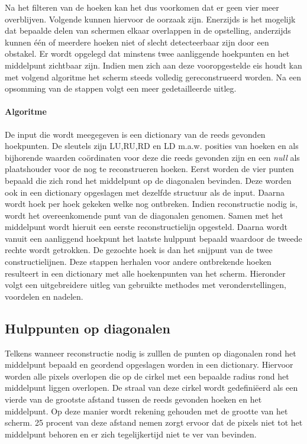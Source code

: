 
	Na het filteren van de hoeken kan het dus voorkomen dat er geen vier meer overblijven. Volgende kunnen hiervoor de oorzaak zijn. Enerzijds is het mogelijk dat bepaalde delen van schermen elkaar overlappen in de opstelling, anderzijds kunnen één of meerdere hoeken niet of slecht detecteerbaar zijn door een obstakel. Er wordt opgelegd dat minstens twee aanliggende hoekpunten en het middelpunt zichtbaar zijn. Indien men zich aan deze vooropgestelde eis houdt kan met volgend algoritme het scherm steeds volledig gereconstrueerd worden. Na een opsomming van de stappen volgt een meer gedetailleerde uitleg.
	\paragraph{Algoritme}
	 De input die wordt meegegeven is een dictionary van de reeds gevonden hoekpunten. De sleutels zijn LU,RU,RD en LD m.a.w. posities van hoeken en als bijhorende waarden coördinaten voor deze die reeds gevonden zijn en een \textit{null} als plaatshouder voor de nog te reconstrueren hoeken. \newline
	 Eerst worden de vier punten bepaald die zich rond het middelpunt op de diagonalen bevinden. Deze worden ook in een dictionary opgeslagen met dezelfde structuur als de input. Daarna wordt hoek per hoek gekeken welke nog ontbreken. Indien reconstructie nodig is, wordt het overeenkomende punt van de diagonalen genomen. Samen met het middelpunt wordt hieruit een eerste reconstructielijn opgesteld. Daarna wordt vanuit een aanliggend hoekpunt het laatste hulppunt bepaald waardoor de tweede rechte wordt getrokken. De gezochte hoek is dan het snijpunt van de twee constructielijnen. Deze stappen herhalen voor andere ontbrekende hoeken resulteert in een dictionary met alle hoekenpunten van het scherm. Hieronder volgt een uitgebreidere uitleg van gebruikte methodes met veronderstellingen, voordelen en nadelen.
	
	\subsection{Hulppunten op diagonalen} \label{subsec:diagonalen}
		
		Telkens wanneer reconstructie nodig is zulllen de punten op diagonalen rond het middelpunt bepaald en geordend opgeslagen worden in een dictionary. Hiervoor worden alle pixels overlopen die op de cirkel met een bepaalde radius rond het middelpunt liggen overlopen. De straal van deze cirkel wordt gedefiniëerd als een vierde van de grootste afstand tussen de reeds gevonden hoeken en het middelpunt. Op deze manier wordt rekening gehouden met de grootte van het scherm. 25 procent van deze afstand nemen zorgt ervoor dat de pixels niet tot het middelpunt behoren en er zich tegelijkertijd niet te ver van bevinden. 
